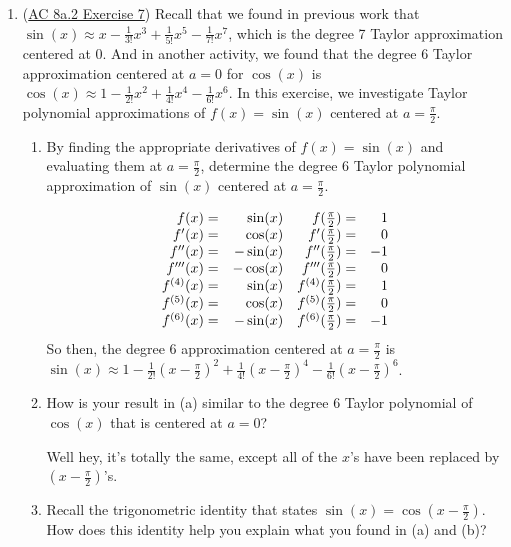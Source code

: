 \documentclass[10pt]{article}
\newenvironment{red}{\color{red}}{\ignorespacesafterend}
\begin{document}
\begin{enumerate}[leftmargin=0pt]
\item (\href{https://faculty.gvsu.edu/boelkinm/Home/ACS/sec-8a-2-taylor-poly.html#ez-8a-2-2}{AC 8a.2 Exercise 7}) Recall that we found in previous work that $\sin(x) \approx x - \tfrac{1}{3!}x^3 + \tfrac{1}{5!}x^5 - \tfrac{1}{7!}x^7$, which is the degree 7 Taylor approximation centered at 0. And in another activity, we found that the degree 6 Taylor approximation centered at $a=0$ for $\cos(x)$ is $\cos(x) \approx 1 - \tfrac{1}{2!}x^2 + \tfrac{1}{4!}x^4 - \tfrac{1}{6!}x^6$. In this exercise, we investigate Taylor polynomial approximations of $f(x) = \sin(x)$ centered at $a=\tfrac\pi2$.

\begin{enumerate}
    \item By finding the appropriate derivatives of $f(x) = \sin(x)$ and evaluating them at $a=\tfrac\pi2$, determine the degree 6 Taylor polynomial approximation of $\sin(x)$ centered at $a=\tfrac\pi2$.
    
    \begin{red}
    \[
\begin{array}{rr rr}
f(x)       =& \sin(x)  & f(\tfrac\pi2)  =& 1  \\
f'(x)      =& \cos(x)  & f'(\tfrac\pi2) =& 0  \\
f''(x)     =& -\sin(x) & f''(\tfrac\pi2)               =& -1 \\
f'''(x)    =& -\cos(x) & f'''(\tfrac\pi2)               =& 0  \\
f^{(4)}(x) =& \sin(x)  & f^{(4)}(\tfrac\pi2)               =& 1  \\
f^{(5)}(x) =& \cos(x)  & f^{(5)}(\tfrac\pi2)               =& 0  \\
f^{(6)}(x) =& -\sin(x) & f^{(6)}(\tfrac\pi2)               =& -1
\end{array}
    \]
    So then, the degree 6 approximation centered at $a=\frac\pi2$ is
    $\sin(x) \approx 1 
    - \frac{1}{2!} \left(x-\frac\pi2\right)^2
    + \frac{1}{4!} \left(x-\frac\pi2\right)^4
    - \frac{1}{6!} \left(x-\frac\pi2\right)^6
    $.
    \end{red}
    \item How is your result in (a) similar to the degree 6 Taylor polynomial of $\cos(x)$ that is centered at $a=0$?
    
    \begin{red}
    Well hey, it's totally the same, except all of the $x$'s have been replaced by $\left(x-\frac{\pi}{2}\right)$'s.
    \end{red}
    \item Recall the trigonometric identity that states $\sin(x) = \cos(x-\tfrac\pi2)$. How does this identity help you explain what you found in (a) and (b)?
    

\end{enumerate}
\end{enumerate}
\end{document}
